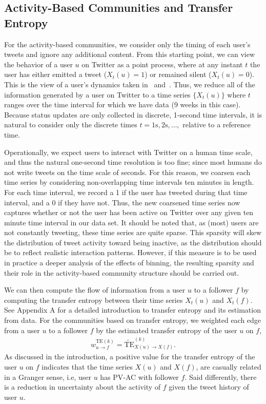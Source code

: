 \subsection{Activity-Based Communities and Transfer Entropy}
\label{sec:method-activity}

For the activity-based communities, we consider only the timing of each user's tweets and ignore any additional content. From this starting point, we can view the behavior of a user $u$ on Twitter as a point process, where at any instant $t$ the user has either emitted a tweet ($X_{t}(u) = 1$) or remained silent ($X_{t}(u) = 0$). This is the view of a user's dynamics taken in~\cite{darmon2013understanding} and~\cite{ver2012information}. Thus, we reduce all of the information generated by a user on Twitter to a time series $\{ X_{t}(u)\}$ where $t$ ranges over the time interval for which we have data (9 weeks in this case). Because status updates are only collected in discrete, 1-second time intervals, it is natural to consider only the discrete times $t = 1 \text{s}, 2 \text{s}, \ldots, $ relative to a reference time. 

Operationally, we expect users to interact with Twitter on a human time scale, and thus the natural one-second time resolution is too fine; since most humans do not write tweets on the time scale of seconds. For this reason, we coarsen each time series by considering non-overlapping time intervals ten minutes in length. For each time interval, we record a 1 if the user has tweeted during that time interval, and a 0 if they have not. Thus, the new coarsened time series now captures whether or not the user has been active on Twitter over any given ten minute time interval in our data set. It should be noted that, as (most) users are not constantly tweeting, these time series are quite sparse. This sparsity will skew the distribution of tweet activity toward being inactive, as the distribution should be to reflect realistic interaction patterns. However, if this measure is to be used in practice a deeper analysis of the effects of binning, the resulting sparsity and their role in the activity-based community structure should be carried out. 

We can then compute the flow of information from a user  $u$ to a follower $f$ by computing the transfer entropy between their time series $X_{t}(u)$ and $X_{t}(f).$ See Appendix A for a detailed introduction to transfer entropy and its estimation from data. For the communities based on transfer entropy, we weighted each edge from a user $u$ to a follower $f$ by the estimated transfer entropy of the user $u$ on $f$, 
\begin{align}
	w_{u \to f}^{\text{TE}(k)} = \widetilde{\text{TE}}_{X(u) \to X(f)}^{(k)}. \label{Eqn-EW-activity}
\end{align}
As discussed in the introduction, a positive value for the transfer entropy of the user $u$ on $f$ indicates that the time series $X(u)$ and $X(f)$, are casually related in a Granger sense, i.e, user $u$ has PV-AC with follower $f$. Said differently, there is a reduction in uncertainty about the activity of $f$ given the tweet history of user $u$.

